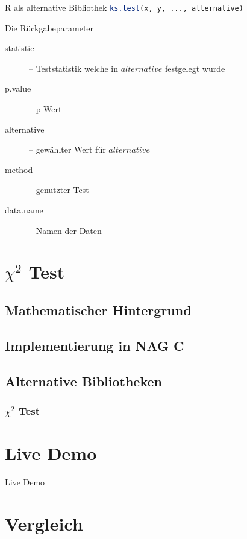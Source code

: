 \documentclass{beamer}
\begin{document}
\begin{frame}{\insertsubsection}

\begin{block}{R als alternative Bibliothek}
	\lstinline[language=R] $ks.test(x, y, ..., alternative)$
\end{block}

\begin{block}{Die Rückgabeparameter}
\begin{description}
	\item[statistic] -- Teststatistik welche in $alternative$ festgelegt wurde
	\item[p.value] -- p Wert
	\item[alternative] -- gewählter Wert für $alternative$
	\item[method] -- genutzter Test
	\item[data.name] -- Namen der Daten
\end{description}
\end{block}

\end{frame}

\section{$\chi^2$ Test}
\subsection{Mathematischer Hintergrund}
\subsection{Implementierung in NAG C}
\subsection{Alternative Bibliotheken}
\begin{frame}
\frametitle{$\chi^2$ Test}
\end{frame}

\section{Live Demo}

\begin{frame}{\insertsection}
\center
\Huge Live Demo
\end{frame}

\section{Vergleich}
\end{document}
